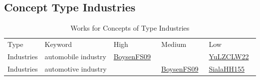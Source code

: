 \clearpage
\subsection{Concept Type Industries}
\label{sec:Industries}
{\scriptsize
\begin{longtable}{lp{3cm}>{\raggedright\arraybackslash}p{6cm}>{\raggedright\arraybackslash}p{6cm}>{\raggedright\arraybackslash}p{8cm}}
\rowcolor{white}\caption{Works for Concepts of Type Industries}\\ \toprule
\rowcolor{white}Type & Keyword & High & Medium & Low\\ \midrule\endhead
\bottomrule
\endfoot
Industries & automobile industry & \href{../cars/works/BoysenFS09.pdf}{BoysenFS09}~\cite{BoysenFS09} &  & \href{../cars/works/YuLZCLW22.pdf}{YuLZCLW22}~\cite{YuLZCLW22}\\
Industries & automotive industry &  & \href{../cars/works/BoysenFS09.pdf}{BoysenFS09}~\cite{BoysenFS09} & \href{../cars/works/SialaHH155.pdf}{SialaHH155}~\cite{SialaHH155}\\
\end{longtable}
}


